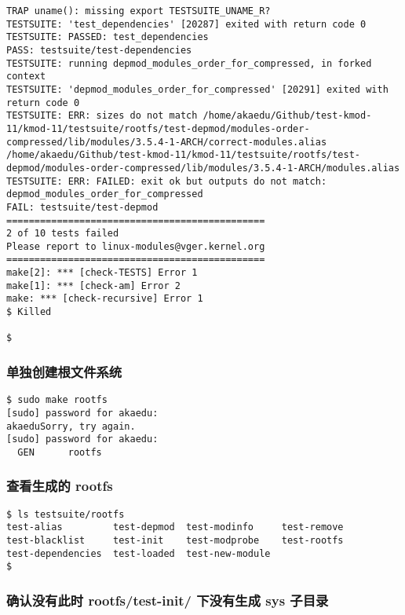 \documentclass[11pt,a4paper]{article}
\begin{document}
{\begin{shaded}
\begin{verbatim}
TRAP uname(): missing export TESTSUITE_UNAME_R?
TESTSUITE: 'test_dependencies' [20287] exited with return code 0
TESTSUITE: PASSED: test_dependencies
PASS: testsuite/test-dependencies
TESTSUITE: running depmod_modules_order_for_compressed, in forked context
TESTSUITE: 'depmod_modules_order_for_compressed' [20291] exited with return code 0
TESTSUITE: ERR: sizes do not match /home/akaedu/Github/test-kmod-11/kmod-11/testsuite/rootfs/test-depmod/modules-order-compressed/lib/modules/3.5.4-1-ARCH/correct-modules.alias /home/akaedu/Github/test-kmod-11/kmod-11/testsuite/rootfs/test-depmod/modules-order-compressed/lib/modules/3.5.4-1-ARCH/modules.alias
TESTSUITE: ERR: FAILED: exit ok but outputs do not match: depmod_modules_order_for_compressed
FAIL: testsuite/test-depmod
==============================================
2 of 10 tests failed
Please report to linux-modules@vger.kernel.org
==============================================
make[2]: *** [check-TESTS] Error 1
make[1]: *** [check-am] Error 2
make: *** [check-recursive] Error 1
$ Killed

$ 
\end{verbatim}\end{shaded}}
\subsubsection{单独创建根文件系统}

{\begin{shaded}\begin{verbatim}
$ sudo make rootfs
[sudo] password for akaedu: 
akaeduSorry, try again.
[sudo] password for akaedu: 
  GEN      rootfs
\end{verbatim}\end{shaded}}
\subsubsection{查看生成的 rootfs}

{\begin{shaded}\begin{verbatim}
$ ls testsuite/rootfs
test-alias         test-depmod  test-modinfo     test-remove
test-blacklist     test-init    test-modprobe    test-rootfs
test-dependencies  test-loaded  test-new-module
$ 
\end{verbatim}\end{shaded}}
\subsubsection{确认没有此时 rootfs/test-init/ 下没有生成 sys 子目录}
\end{document}
